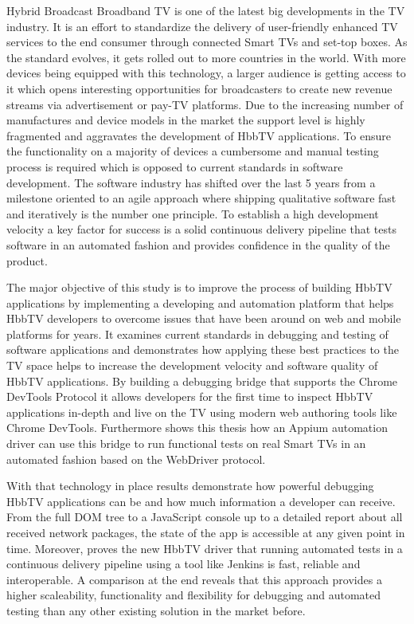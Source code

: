 Hybrid Broadcast Broadband TV is one of the latest big developments in the TV industry. It is an effort to standardize the delivery of user-friendly enhanced TV services to the end consumer through connected Smart TVs and set-top boxes. As the standard evolves, it gets rolled out to more countries in the world. With more devices being equipped with this technology, a larger audience is getting access to it which opens interesting opportunities for broadcasters to create new revenue streams via advertisement or pay-TV platforms. Due to the increasing number of manufactures and device models in the market the support level is highly fragmented and aggravates the development of HbbTV applications. To ensure the functionality on a majority of devices a cumbersome and manual testing process is required which is opposed to current standards in software development. The software industry has shifted over the last 5 years from a milestone oriented to an agile approach where shipping qualitative software fast and iteratively is the number one principle. To establish a high development velocity a key factor for success is a solid continuous delivery pipeline that tests software in an automated fashion and provides confidence in the quality of the product.

The major objective of this study is to improve the process of building HbbTV applications by implementing a developing and automation platform that helps HbbTV developers to overcome issues that have been around on web and mobile platforms for years. It examines current standards in debugging and testing of software applications and demonstrates how applying these best practices to the TV space helps to increase the development velocity and software quality of HbbTV applications. By building a debugging bridge that supports the Chrome DevTools Protocol it allows developers for the first time to inspect HbbTV applications in-depth and live on the TV using modern web authoring tools like Chrome DevTools. Furthermore shows this thesis how an Appium automation driver can use this bridge to run functional tests on real Smart TVs in an automated fashion based on the WebDriver protocol.

With that technology in place results demonstrate how powerful debugging HbbTV applications can be and how much information a developer can receive. From the full DOM tree to a JavaScript console up to a detailed report about all received network packages, the state of the app is accessible at any given point in time. Moreover, proves the new HbbTV driver that running automated tests in a continuous delivery pipeline using a tool like Jenkins is fast, reliable and interoperable. A comparison at the end reveals that this approach provides a higher scaleability, functionality and flexibility for debugging and automated testing than any other existing solution in the market before.
